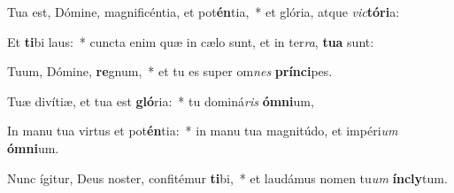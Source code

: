 \item Tua est, Dómine, magnificéntia, et pot\textbf{én}tia,~* et glória, atque \textit{vic}\textbf{tó}\textbf{ri}a:
\item Et \textbf{ti}bi laus:~* cuncta enim quæ in cælo sunt, et in ter\textit{ra}, \textbf{tu}\textbf{a} sunt:
\item Tuum, Dómine, \textbf{re}gnum,~* et tu es super om\textit{nes} \textbf{prín}\textbf{ci}pes.
\item Tuæ divítiæ, et tua est \textbf{gló}ria:~* tu dominá\textit{ris} \textbf{óm}\textbf{ni}um,
\item In manu tua virtus et pot\textbf{én}tia:~* in manu tua magnitúdo, et impéri\textit{um} \textbf{óm}\textbf{ni}um.
\item Nunc ígitur, Deus noster, confitémur \textbf{ti}bi,~* et laudámus nomen tu\textit{um} \textbf{ín}\textbf{cly}tum.

